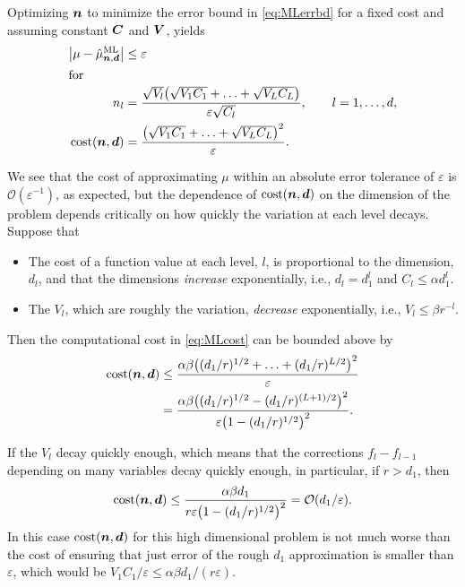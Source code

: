 \documentclass{svproc}
\begin{document}
Optimizing ${\boldsymbol{n}}$ to minimize the error bound in \eqref{eq:MLerrbd} for a fixed cost and assuming constant ${\boldsymbol{C}}$ and ${\boldsymbol{V}}$, yields
\begin{align}
    \bigl \lvert \mu - \hat{\mu}^{\text{ML}}_{{\boldsymbol{n}},{\boldsymbol{d}}} \bigr \rvert &\le \varepsilon \\
\intertext{for}
    n_l & = \frac{\sqrt{V_l} \bigl(\sqrt{V_1 C_1} + \ldots + \sqrt{V_LC_L}\bigr)}{\varepsilon \sqrt{C_l} }, \qquad l = 1, \ldots, d,\\
    \text{cost}({\boldsymbol{n}},{\boldsymbol{d}}) & = \frac{\bigl(\sqrt{V_1 C_1} + \ldots + \sqrt{V_LC_L}\bigr)^2}{\varepsilon}. \label{eq:MLcost}
\end{align}

We see that the cost of approximating $\mu$ within an absolute error tolerance of $\varepsilon$ is $\mathcal{O}(\varepsilon^{-1})$, as expected, but the dependence of $\text{cost}({\boldsymbol{n}},{\boldsymbol{d}})$ on the dimension of the problem depends critically on how quickly the variation at each level decays.  Suppose that 
\begin{itemize}
    \item The cost of a function value at each level, $l$, is proportional to the dimension, $d_l$, and that the dimensions \emph{increase} exponentially, i.e.,  $d_l = d_1^{l}$ and $C_l \le \alpha d_1^l$. 
    \item The $V_l$, which are roughly the variation, \emph{decrease} exponentially, i.e., $V_l \le \beta r^{-l} $.
\end{itemize}   
Then the computational cost in \eqref{eq:MLcost} can be bounded above by
\begin{align*}
     \text{cost}({\boldsymbol{n}},{\boldsymbol{d}}) & \le \frac{\alpha \beta \bigl((d_1/r)^{1/2} + \ldots + (d_1/r)^{L/2}\bigr)^2}{\varepsilon} \\
     & = \frac{\alpha \beta \bigl((d_1/r)^{1/2} - (d_1/r)^{(L+1)/2}\bigr)^2}{\varepsilon \bigl( 1 - (d_1/r)^{1/2}\bigr)^2}.
\end{align*}

If the $V_l$ decay quickly enough, which means that the corrections $f_l - f_{l-1}$ depending on many variables decay quickly enough, in particular, if $r > d_1$, then 
\begin{equation}
         \text{cost}({\boldsymbol{n}},{\boldsymbol{d}}) \le \frac{\alpha \beta d_1} {r \varepsilon \bigl( 1 - (d_1/r)^{1/2}\bigr)^2} = \mathcal{O}(d_1/\varepsilon).
\end{equation}
In this case $\text{cost}({\boldsymbol{n}},{\boldsymbol{d}})$ for this high dimensional problem is not much worse than the cost of ensuring that just error of the rough $d_1$ approximation is smaller than $\varepsilon$, which would be $V_1C_1/\varepsilon \le \alpha \beta d_1/(r\varepsilon)$.  
\end{document}
